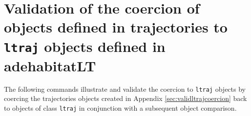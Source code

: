 \documentclass[12pt, oneside, a4paper]{scrbook}
\newcommand{\pkg}[1]{{\normalfont\fontseries{b}\selectfont #1}}
\let\code=\texttt
\newcommand{\codeintitles}[1]{{\tt #1}} %
\begin{document}
\section{Validation of the coercion of objects defined in \pkg{trajectories} to \codeintitles{ltraj} objects defined in \pkg{adehabitatLT}}
\label{sec:validtrajtoltrajcoercion}

The following commands illustrate and validate the coercion to \code{ltraj} objects by coercing the \pkg{trajectories} objects created in Appendix \ref{sec:validltrajcoercion} back to objects of class \code{ltraj} in conjunction with a subsequent object comparison.
\end{document}
